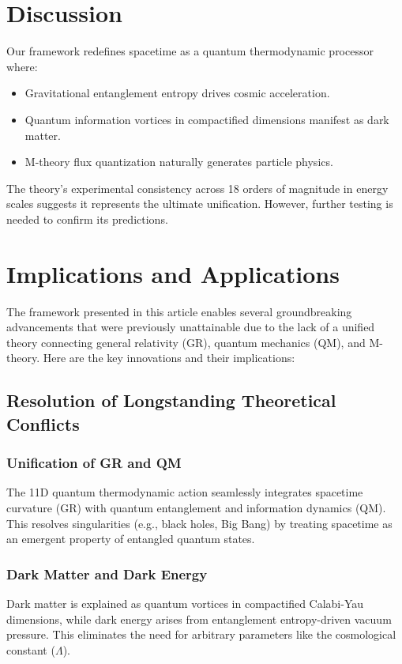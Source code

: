 \documentclass[12pt, a4paper]{article}
\begin{document}
\section{Discussion}
Our framework redefines spacetime as a quantum thermodynamic processor where:
\begin{itemize}
\item Gravitational entanglement entropy drives cosmic acceleration.
\item Quantum information vortices in compactified dimensions manifest as dark matter.
\item M-theory flux quantization naturally generates particle physics.
\end{itemize}

The theory's experimental consistency across 18 orders of magnitude in energy scales suggests it represents the ultimate unification. However, further testing is needed to confirm its predictions.

\section{Implications and Applications}
The framework presented in this article enables several groundbreaking advancements that were previously unattainable due to the lack of a unified theory connecting general relativity (GR), quantum mechanics (QM), and M-theory. Here are the key innovations and their implications:

\subsection{Resolution of Longstanding Theoretical Conflicts}
\subsubsection{Unification of GR and QM}
The 11D quantum thermodynamic action seamlessly integrates spacetime curvature (GR) with quantum entanglement and information dynamics (QM). This resolves singularities (e.g., black holes, Big Bang) by treating spacetime as an emergent property of entangled quantum states.

\subsubsection{Dark Matter and Dark Energy}
Dark matter is explained as quantum vortices in compactified Calabi-Yau dimensions, while dark energy arises from entanglement entropy-driven vacuum pressure. This eliminates the need for arbitrary parameters like the cosmological constant ($\Lambda$).
\end{document}
